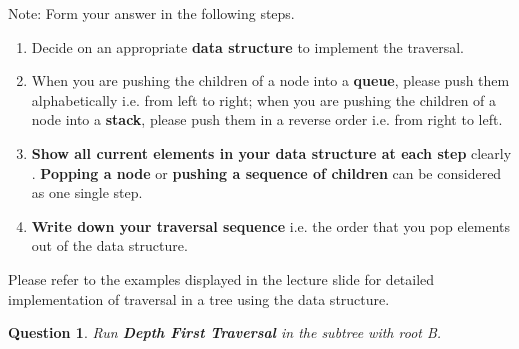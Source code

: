 \documentclass[10.5pt]{article}
\newtheorem{Q}{Question}
\begin{document}
	Note: Form your answer in the following steps.
	\begin{enumerate}[1.]
		\item Decide on an appropriate \textbf{data structure} to implement the traversal.
		\item When you are pushing the children of a node into a \textbf{queue}, please push them alphabetically i.e. from left to right; when you are pushing the children of a node into a \textbf{stack}, please push them in a reverse order i.e. from right to left. 
		\item \textbf{Show all current elements in your data structure at each step} clearly  . \textbf{Popping a node} or \textbf{pushing a sequence of children} can be considered as one single step.
		\item \textbf{Write down your traversal sequence} i.e. the order that you pop elements out of the data structure.
	\end{enumerate}
	
	Please refer to the examples displayed in the lecture slide for detailed implementation of traversal in a tree using the data structure.

	
	\vspace{0.1cm}
	\begin{Q} 
		Run \textbf{Depth First Traversal} in the subtree with root B.
	\end{Q}
\end{document}
